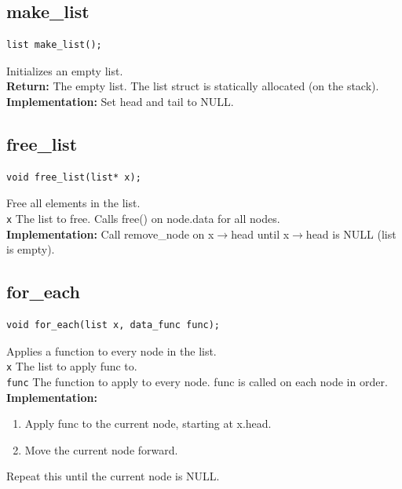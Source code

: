 \documentclass{article}
\begin{document}
\subsection{make\_list}
\begin{lstlisting}
list make_list();
\end{lstlisting}


  Initializes an empty list.\\ 
 \textbf{Return:} The empty list.
  The list struct is statically allocated (on the stack).\\ 
 
 
 \textbf{Implementation:}
Set head and tail to NULL.
 

\subsection{free\_list}
\begin{lstlisting}
void free_list(list* x);
\end{lstlisting}


  Free all elements in the list.\\ 
 \texttt{x} The list to free.
  Calls  free() on  node.data for all nodes.\\ 
 
 
 \textbf{Implementation:}
Call  remove\_node on  x$\rightarrow$head until x$\rightarrow$head is NULL (list is empty).
 

\subsection{for\_each}
\begin{lstlisting}
void for_each(list x, data_func func);
\end{lstlisting}


  Applies a function to every  node in the  list.\\ 
 \texttt{x} The list to apply  func to.\\ 
 \texttt{func} The function to apply to every node.
   func is called on each  node in order.\\ 
 
 
 \textbf{Implementation:}
 \begin{enumerate}
\item Apply  func to the current node, starting at  x.head.
\item Move the current node forward.
\end{enumerate}
Repeat this until the current node is NULL.
 
\end{document}
